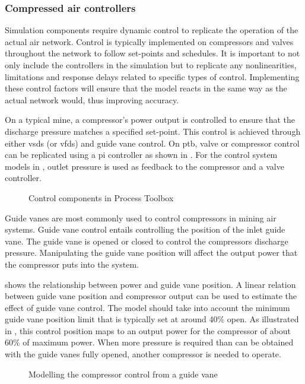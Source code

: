 		\subsubsection{Compressed air controllers}\label{Controllers}
			Simulation components require dynamic control to replicate the operation of the actual air network. Control is typically implemented on compressors and valves throughout the network to follow  set-points and schedules. It is important to not only include the controllers in the simulation but to replicate any nonlinearities, limitations and response delays related to specific types of control. Implementing these control factors will ensure that the model reacts in the same way as the actual network would, thus improving accuracy.
			\par 
			On a typical mine, a compressor's power output is controlled to ensure that the discharge pressure matches a specified  set-point. This control is achieved through either \glspl{vsd} (or \glspl{vfd}) and guide vane control. On \gls{ptb}, valve or compressor control can be replicated using a \gls{pi} controller as shown in . For the control system models in , outlet pressure is used as feedback to the compressor and a valve controller. 
			\par 
			
	\begin{figure}[h!]
		\centering
		\caption[Control components in Process Toolbox]{Control components in Process Toolbox}
		\label{fig: Controller models}
	\end{figure}
		Guide vanes are most commonly used to control compressors in mining air systems. Guide vane control entails controlling the position of the inlet guide vane. The guide vane is opened or closed to control the compressors discharge pressure. Manipulating the guide vane position will affect the output power that the compressor puts into the system. 
		\par 
		 shows the relationship between power and guide vane position. A linear relation between guide vane position and compressor output can be used to estimate the effect of guide vane control. The model should take into account the minimum guide vane position limit that is typically set at around 40\% open. As illustrated in , this control position maps to an output power for the compressor of about 60\% of maximum power. When more pressure is required than can be obtained with the guide vanes fully opened, another compressor is needed to operate. 
		\begin{figure}[h]
			\centering
			\fbox{}
			\caption{Modelling the compressor control from a guide vane\protect \footnotemark[1]}
			\label{fig: Guide vane position}
		\end{figure}
	
